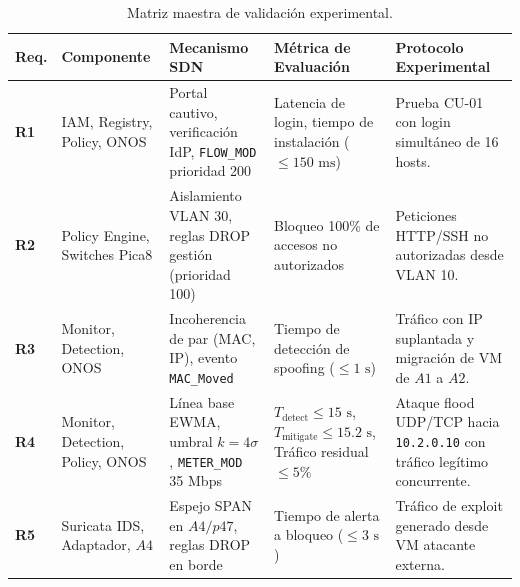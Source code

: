 \documentclass[11pt,a4paper]{report}
\begin{document}
\begin{table}[h!]
\centering
\small
\begin{tabularx}{\linewidth}{p{1.0cm}p{2.6cm}p{3.2cm}p{3.2cm}X}
\toprule
\textbf{Req.} & \textbf{Componente} & \textbf{Mecanismo SDN} & \textbf{Métrica de Evaluación} & \textbf{Protocolo Experimental} \\
\midrule
\textbf{R1} & IAM, Registry, Policy, ONOS & Portal cautivo, verificación IdP, \texttt{FLOW\_MOD} prioridad 200 & Latencia de login, tiempo de instalación ($\le 150\text{ ms}$) & Prueba CU-01 con login simultáneo de 16 hosts. \\
\textbf{R2} & Policy Engine, Switches Pica8 & Aislamiento VLAN 30, reglas DROP gestión (prioridad 100) & Bloqueo 100\% de accesos no autorizados & Peticiones HTTP/SSH no autorizadas desde VLAN 10. \\
\textbf{R3} & Monitor, Detection, ONOS & Incoherencia de par (MAC, IP), evento \texttt{MAC\_Moved} & Tiempo de detección de spoofing ($\le 1\text{ s}$) & Tráfico con IP suplantada y migración de VM de $A1$ a $A2$. \\
\textbf{R4} & Monitor, Detection, Policy, ONOS & Línea base EWMA, umbral $k=4\sigma$, \texttt{METER\_MOD} 35 Mbps & $T_{\text{detect}} \le 15\text{ s}$, $T_{\text{mitigate}} \le 15.2\text{ s}$, Tráfico residual $\le 5\%$ & Ataque flood UDP/TCP hacia \texttt{10.2.0.10} con tráfico legítimo concurrente. \\
\textbf{R5} & Suricata IDS, Adaptador, $A4$ & Espejo SPAN en $A4/p47$, reglas DROP en borde & Tiempo de alerta a bloqueo ($\le 3\text{ s}$) & Tráfico de exploit generado desde VM atacante externa. \\
\bottomrule
\end{tabularx}
\caption{Matriz maestra de validación experimental.}
\label{tab:maestra}
\end{table}
\end{document}
